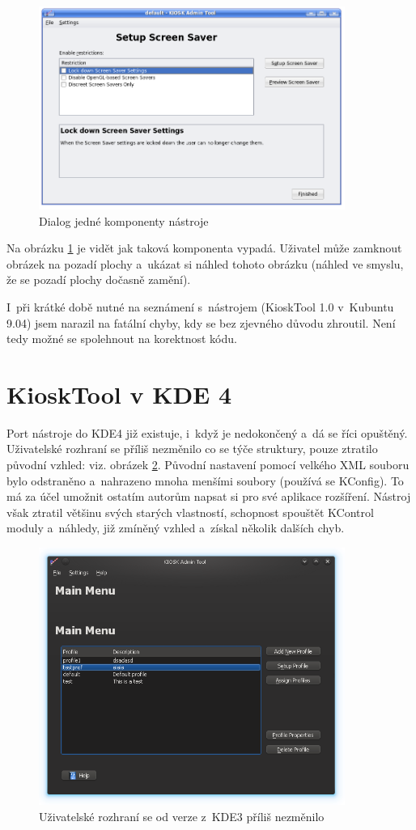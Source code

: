 \begin{figure}[h]
    \centering
    \includegraphics[width=10cm]{obrazky/KioskToolKDE3/ukazka_komponenty.png}
    \caption{Dialog jedné komponenty nástroje}
    \label{fig:kt3_nast_komp}
\end{figure}
Na obrázku \ref{fig:kt3_nast_komp} je vidět jak taková komponenta vypadá. Uživatel může zamknout obrázek na pozadí plochy a~ukázat si náhled tohoto obrázku (náhled ve smyslu, že se pozadí plochy dočasně zamění).

I~při krátké době nutné na seznámení s~nástrojem (KioskTool 1.0 v~Kubuntu 9.04) jsem narazil na fatální chyby, kdy se bez zjevného důvodu zhroutil. Není tedy možné se spolehnout na korektnost kódu.

\section{KioskTool v KDE 4}
Port nástroje do KDE4 již existuje, i~když je nedokončený a~dá se říci opuštěný. Uživatelské rozhraní se příliš nezměnilo co se týče struktury, pouze ztratilo původní vzhled: viz. obrázek \ref{fig:kt4_uvod}. Původní nastavení pomocí velkého XML souboru bylo odstraněno a~nahrazeno mnoha menšími soubory (používá se KConfig). To má za účel umožnit ostatím autorům napsat si pro své aplikace rozšíření. Nástroj však ztratil většinu svých starých vlastností, schopnost spouštět KControl moduly a~náhledy, již zmíněný vzhled a~získal několik dalších chyb.

\begin{figure}[h]
    \centering
    \includegraphics[width=10cm]{obrazky/KioskToolKDE4/kiosktool_kde4.png}
    \caption{Uživatelské rozhraní se od verze z~KDE3 příliš nezměnilo}
    \label{fig:kt4_uvod}
\end{figure}

